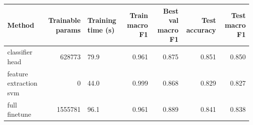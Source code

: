 \begin{tabular}{lrlrrrr}
\toprule
Method & Trainable params & Training time (s) & Train macro F1 & Best val macro F1 & Test accuracy & Test macro F1 \\
\midrule
classifier head & 628773 & 79.9 & 0.961 & 0.875 & 0.851 & 0.850 \\
feature extraction svm & 0 & 44.0 & 0.999 & 0.868 & 0.829 & 0.827 \\
full finetune & 1555781 & 96.1 & 0.961 & 0.889 & 0.841 & 0.838 \\
\bottomrule
\end{tabular}
